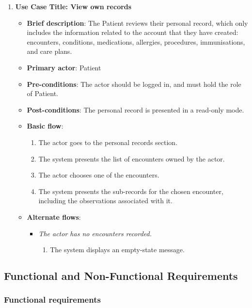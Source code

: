 \begin{enumerate}
\vspace{0.5em}

\item \textbf{Use Case Title: View own records}
\begin{itemize}
    \item \textbf{Brief description}: The Patient reviews their personal record, which only includes the information related to the account that they have created: encounters, conditions, medications, allergies, procedures, immunisations, and care plans.
    \item \textbf{Primary actor}: Patient
    \item \textbf{Pre-conditions}: The actor should be logged in, and must hold the role of Patient.
    \item \textbf{Post-conditions}: The personal record is presented in a read-only mode.
    \item \textbf{Basic flow}:
    \begin{enumerate}
        \item The actor goes to the personal records section.
        \item The system presents the list of encounters owned by the actor.
        \item The actor chooses one of the encounters.
        \item The system presents the sub-records for the chosen encounter, including the observations associated with it.
    \end{enumerate}
    \item \textbf{Alternate flows}:
    \begin{itemize}
        \item[2a.] \textit{The actor has no encounters recorded.}
        \begin{enumerate}
            \item The system displays an empty-state message.
        \end{enumerate}
    \end{itemize}
\end{itemize}

\end{enumerate}

\subsection{Functional and Non-Functional Requirements}

\subsubsection*{Functional requirements}

